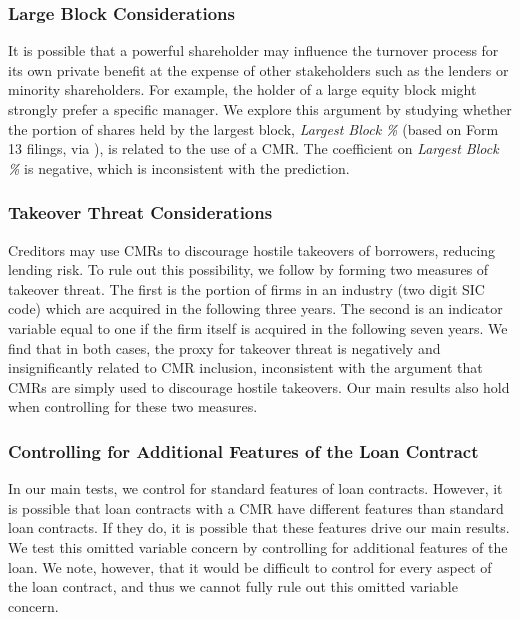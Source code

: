 \documentclass[a4paper,12pt]{article}
\begin{document}
\subsubsection{Large Block Considerations}

It is possible that a powerful shareholder may influence the turnover process for its own private benefit at the expense of other stakeholders such as the lenders or minority shareholders.
For example, the holder of a large equity block might strongly prefer a specific manager.
We explore this argument by studying whether the portion of shares held by the largest block, \textit{Largest Block \%} (based on Form 13 filings, via \citealp{Volkova_2017}), is related to the use of a CMR.
The coefficient on \textit{Largest Block \%} is negative, which is inconsistent with the prediction.



\subsubsection{Takeover Threat Considerations}

Creditors may use CMRs to discourage hostile takeovers of borrowers, reducing lending risk.
To rule out this possibility, we follow \cite{Agrawal_1998} by forming two measures of takeover threat.
The first is the portion of firms in an industry (two digit SIC code) which are acquired in the following three years. The second is an indicator variable equal to one if the firm itself is acquired in the following seven years.
We find that in both cases, the proxy for takeover threat is negatively and insignificantly related to CMR inclusion, inconsistent with the argument that CMRs are simply used to discourage hostile takeovers.
Our main results also hold when controlling for these two measures.




\subsubsection{Controlling for Additional Features of the Loan Contract}

In our main tests, we control for standard features of loan contracts. 
However, it is possible that loan contracts with a CMR have different features than standard loan contracts.
If they do, it is possible that these features drive our main results.
We test this omitted variable concern by controlling for additional features of the loan.
We note, however, that it would be difficult to control for every aspect of the loan contract, and thus we cannot fully rule out this omitted variable concern.
\end{document}
